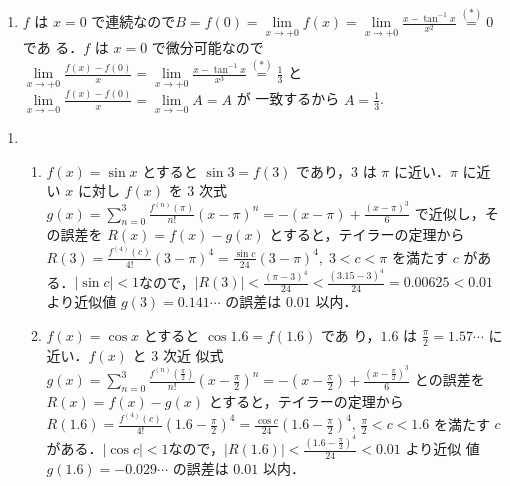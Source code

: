 \documentclass[11pt, uplatex, dvipdfmx, twoside]{jsarticle}
\newcommand{\ds}{\displaystyle}
\renewcommand{\dlim}{\lim\limits} %
\begin{document}
\begin{enumerate}[label=\ref{sec:hospital}.\arabic*]
\begin{enumerate}[label=(\arabic*)]
  \item $f$ は $x=0$
    で連続なので$B=f(0) = \dlim_{x \to +0} f(x) = \dlim_{x \to +0}
    \frac{x-\tan^{-1}x}{x^2} \overset{(\ast)}{=} 0$ であ
    る．$f$ は $x=0$
    で微分可能なので$\dlim_{x \to +0}\frac{f(x)-f(0)}{x} = \dlim_{x
      \to +0} \frac{x-\tan^{-1}x}{x^3} \overset{(\ast)}{=} \frac{1}{3}$
    と$\dlim_{x \to -0} \frac{f(x)-f(0)}{x} = \dlim_{x \to -0} A=A$ が
    一致するから $A=\frac{1}{3}$.
    
  \end{enumerate}
\end{enumerate}

\newpage

\begin{enumerate}[label=\ref{sec:taylor}.\arabic*]
  \setlength{\itemsep}{1ex}
  
\item
  \begin{enumerate}[label=(\arabic*)]

    \setlength{\itemsep}{1ex}
    
  \item $f(x) = \sin x$ とすると $\sin 3 = f(3)$ であり，$3$ は $\pi$
    に近い．$\pi$ に近い $x$ に対し $f(x)$ を $3$ 次式
    $g(x) = {\ds \sum_{n=0}^{3}} \frac{f^{(n)}(\pi)}{n!} (x-\pi)^n=
    -(x-\pi) + \frac{(x-\pi)^3}{6} $ で近似し，その誤差を $R(x) = f(x)
    - g(x)$
    とすると，テイラーの定理から$R(3) = \frac{f^{(4)}(c)}{4!}(3-\pi)^4
    = \frac{\sin c}{24}(3-\pi)^4, \; 3 < c < \pi$ を満たす $c$ があ
    る．$|\sin c|
    <1$なので，$|R(3)| < \frac{(\pi-3)^4}{24}<
    \frac{(3.15-3)^4}{24}=0.00625 < 0.01$ より近似値 $g(3)=
    0.141\cdots$ の誤差は $0.01$ 以内．

  \item $f(x) = \cos x$ とすると $\cos 1.6 = f(1.6)$ であ
    り，$1.6$ は $\frac{\pi}{2}=1.57\cdots $ に近い．$f(x)$ と $3$ 次近
    似式
    $g(x) = {\ds \sum_{n=0}^{3}}
    \frac{f^{(n)}\left(\frac{\pi}{2}\right)}{n!}\left(x-\frac{\pi}{2}\right)^n
    = -\left(x-\frac{\pi}{2}\right) +
    \frac{\left(x-\frac{\pi}{2}\right)^3}{6}$ との誤差を
    $R(x) = f(x) - g(x)$
    とすると，テイラーの定理から$R(1.6) =
    \frac{f^{(4)}(c)}{4!}\left(1.6-\frac{\pi}{2}\right)^4 = \frac{
      \cos c}{24}\left( 1.6-\frac{\pi}{2}\right)^4 , \, \frac{\pi}{2}
    < c < 1.6$ を満たす $c$ がある．$|\cos c|
    <1$なので，$|R(1.6)| < \frac{\left(1.6 -
        \frac{\pi}{2}\right)^4}{24} < 0.01$ より近似
    値 $g(1.6)=-0.029\cdots$ の誤差は $0.01$ 以内．


\end{enumerate}
\end{enumerate}
\end{document}
